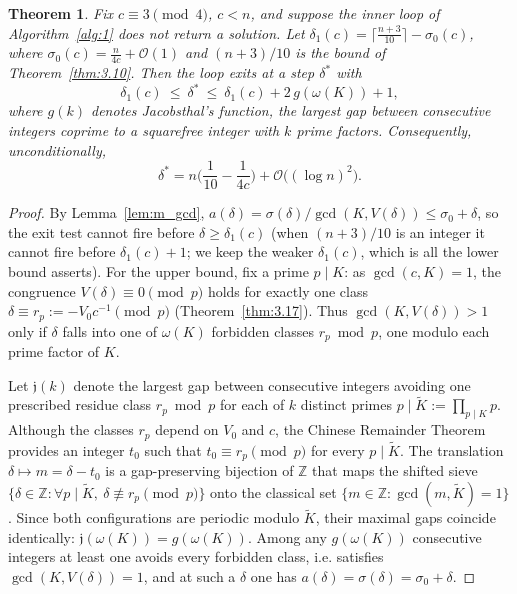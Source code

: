 \documentclass[11pt, a4paper]{article}
\theoremstyle{plain}
\newtheorem{theorem}{Theorem}[section]
\theoremstyle{definition}
\newcommand{\Z}{\mathbb{Z}}
\begin{document}
\begin{theorem}\label{thm:reject_cost}
Fix $c\equiv3\pmod4$, $c<n$, and suppose the inner loop of Algorithm~\ref{alg:1} does not return a solution. Let $\delta_1(c)=\lceil\frac{n+3}{10}\rceil-\sigma_0(c)$, where $\sigma_0(c)=\frac n{4c}+\mathcal{O}(1)$ and $(n+3)/10$ is the bound of Theorem~\ref{thm:3.10}. Then the loop exits at a step $\delta^{*}$ with
$$\delta_1(c)\ \le\ \delta^{*}\ \le\ \delta_1(c)+2\,g(\omega(K))+1,$$
where $g(k)$ denotes Jacobsthal's function, the largest gap between consecutive integers coprime to a squarefree integer with $k$ prime factors. Consequently, unconditionally,
$$\delta^{*}=n\Big(\frac{1}{10}-\frac{1}{4c}\Big)+\mathcal{O}\big((\log n)^{2}\big).$$
\end{theorem}
\begin{proof}
By Lemma~\ref{lem:m_gcd}, $a(\delta)=\sigma(\delta)/\gcd(K,V(\delta))\le\sigma_0+\delta$, so the exit test cannot fire before $\delta\ge\delta_1(c)$ (when $(n+3)/10$ is an integer it cannot fire before $\delta_1(c)+1$; we keep the weaker $\delta_1(c)$, which is all the lower bound asserts). For the upper bound, fix a prime $p\mid K$: as $\gcd(c,K)=1$, the congruence $V(\delta)\equiv0\pmod p$ holds for exactly one class $\delta\equiv r_p:=-V_0c^{-1}\pmod p$ (Theorem~\ref{thm:3.17}). Thus $\gcd(K,V(\delta))>1$ only if $\delta$ falls into one of $\omega(K)$ forbidden classes $r_p\bmod p$, one modulo each prime factor of $K$.

Let $\mathfrak{j}(k)$ denote the largest gap between consecutive integers avoiding one prescribed residue class $r_p\bmod p$ for each of $k$ distinct primes $p\mid\widetilde{K}:=\prod_{p\mid K}p$. Although the classes $r_p$ depend on $V_0$ and $c$, the Chinese Remainder Theorem provides an integer $t_0$ such that $t_0\equiv r_p\pmod p$ for every $p\mid\widetilde{K}$. The translation $\delta\mapsto m=\delta-t_0$ is a gap-preserving bijection of $\Z$ that maps the shifted sieve $\{ \delta\in\Z : \forall p\mid\widetilde{K},\ \delta\not\equiv r_p\pmod p \}$ onto the classical set $\{ m\in\Z : \gcd(m,\widetilde{K})=1 \}$. Since both configurations are periodic modulo $\widetilde{K}$, their maximal gaps coincide identically: $\mathfrak{j}(\omega(K))=g(\omega(K))$. Among any $g(\omega(K))$ consecutive integers at least one avoids every forbidden class, i.e. satisfies $\gcd(K,V(\delta))=1$, and at such a $\delta$ one has $a(\delta)=\sigma(\delta)=\sigma_0+\delta$.


\end{proof}
\end{document}
